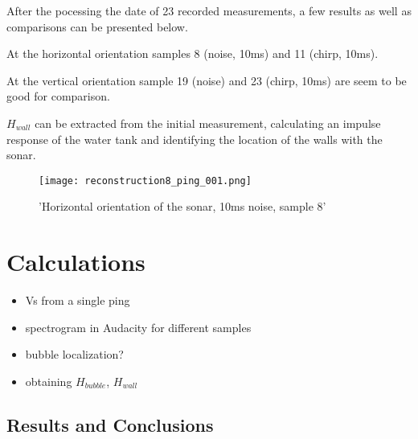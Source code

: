 After the pocessing the date of 23 recorded measurements, a few results as well as comparisons can be presented below. 

At the horizontal orientation samples 8 (noise, 10ms) and 11 (chirp, 10ms).

At the vertical orientation sample 19 (noise) and 23 (chirp, 10ms) are seem to be good for comparison.

\textbf{$H_{wall}$} can be extracted from the initial measurement, calculating an impulse response of the water tank and identifying the location of the walls with the sonar.

\begin{figure}[H]
    \texttt{[image: reconstruction8\_ping\_001.png]}
    \centering
    \caption*{'Horizontal orientation of the sonar, 10ms noise, sample 8'}
    \label{fig:H_noise_10ms_plot}
\end{figure}


\section{Calculations}

\begin{itemize}
    \item Vs from a single ping
    \item spectrogram in Audacity for different samples
    \item bubble localization?
    \item obtaining $H_{bubble}$, $H_{wall}$
\end{itemize}


\subsection{Results and Conclusions}



